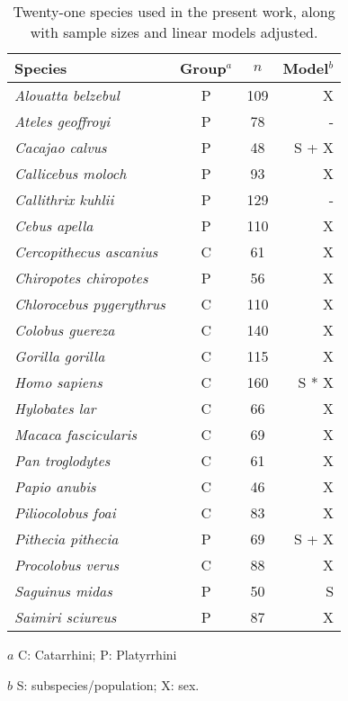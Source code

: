 \begin{table}[ht]
  \centering
  \begin{threeparttable}
    \caption{Twenty-one species used in the present work, along with sample sizes and linear models adjusted. \label{tab:modcomp_otu}}
    \begin{tabular}{lccr}
      \toprule
      Species & Group$^a$ & $n$ & Model$^b$ \\ 
      \midrule
      \emph{Alouatta belzebul} & P & 109 & X \\ 
      \emph{Ateles geoffroyi} & P & 78 & - \\ 
      \emph{Cacajao calvus} & P & 48 & S + X \\ 
      \emph{Callicebus moloch} & P & 93 & X \\ 
      \emph{Callithrix kuhlii} & P & 129 & - \\ 
      \emph{Cebus apella} & P & 110 & X \\ 
      \emph{Cercopithecus ascanius} & C & 61 & X \\ 
      \emph{Chiropotes chiropotes} & P & 56 & X \\ 
      \emph{Chlorocebus pygerythrus} & C & 110 & X \\ 
      \emph{Colobus guereza} & C & 140 & X \\ 
      \emph{Gorilla gorilla} & C & 115 & X \\ 
      \emph{Homo sapiens} & C & 160 & S * X \\ 
      \emph{Hylobates lar} & C & 66 & X \\ 
      \emph{Macaca fascicularis} & C & 69 & X \\ 
      \emph{Pan troglodytes} & C & 61 & X \\ 
      \emph{Papio anubis} & C & 46 & X \\ 
      \emph{Piliocolobus foai} & C & 83 & X \\ 
      \emph{Pithecia pithecia} & P & 69 & S + X \\ 
      \emph{Procolobus verus} & C & 88 & X \\ 
      \emph{Saguinus midas} & P & 50 & S \\ 
      \emph{Saimiri sciureus} & P & 87 & X \\ 
      \bottomrule
    \end{tabular}
    \begin{tablenotes}
      \footnotesize
      {
      \item[$a$] C: Catarrhini; P: Platyrrhini
      \item[$b$] S: subspecies/population; X: sex.
      }
    \end{tablenotes}
  \end{threeparttable}
\end{table}